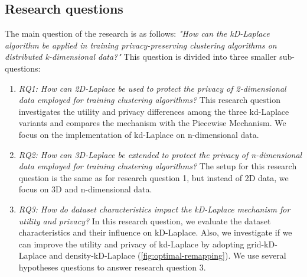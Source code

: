 \subsection{Research questions}
The main question of the research is as follows: \newline \newline
\textit{"How can the kD-Laplace algorithm be applied in training privacy-preserving clustering algorithms on distributed k-dimensional data?"} \newline
This question is divided into three smaller sub-questions:
\begin{enumerate}
  \item \textit{RQ1: How can 2D-Laplace be used to protect the privacy of 2-dimensional data employed for training clustering algorithms?} \newline
        This research question investigates the utility and privacy differences among the three kd-Laplace variants and compares the mechanism with the Piecewise Mechanism.
        We focus on the implementation of kd-Laplace on n-dimensional data.
  \item \textit{RQ2: How can 3D-Laplace be extended to protect the privacy of n-dimensional data employed for training clustering algorithms?} \newline
        The setup for this research question is the same as for research question 1, but instead of 2D data, we focus on 3D and n-dimensional data.
  \item \textit{RQ3: How do dataset characteristics impact the kD-Laplace mechanism for utility and privacy?} \newline
        In this research question, we evaluate the dataset characteristics and their influence on kD-Laplace.
        Also, we investigate if we can improve the utility and privacy of kd-Laplace by adopting grid-kD-Laplace and density-kD-Laplace (\ref{fig:optimal-remapping}).
        We use several hypotheses questions to answer research question 3.


\end{enumerate}
